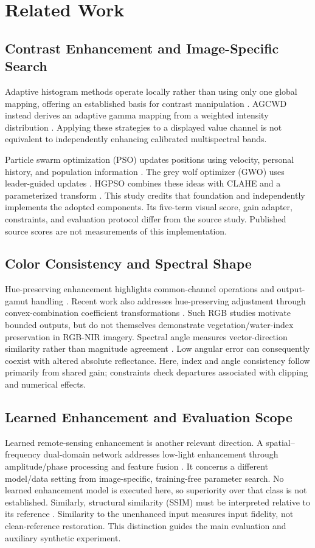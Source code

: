 \documentclass[conference]{IEEEtran}
\begin{document}
\section{Related Work}
\label{sec:related}
\subsection{Contrast Enhancement and Image-Specific Search}
Adaptive histogram methods operate locally rather than using only one global mapping, offering an established basis for contrast manipulation \cite{pizer1987}. AGCWD instead derives an adaptive gamma mapping from a weighted intensity distribution \cite{huang2013}. Applying these strategies to a displayed value channel is not equivalent to independently enhancing calibrated multispectral bands.

Particle swarm optimization (PSO) updates positions using velocity, personal history, and population information \cite{poli2007}. The grey wolf optimizer (GWO) uses leader-guided updates \cite{mirjalili2014}. HGPSO combines these ideas with CLAHE and a parameterized transform \cite{rentapalli2026}. This study credits that foundation and independently implements the adopted components. Its five-term visual score, gain adapter, constraints, and evaluation protocol differ from the source study. Published source scores are not measurements of this implementation.

\subsection{Color Consistency and Spectral Shape}
Hue-preserving enhancement highlights common-channel operations and output-gamut handling \cite{naik2003}. Recent work also addresses hue-preserving adjustment through convex-combination coefficient transformations \cite{ueda2025}. Such RGB studies motivate bounded outputs, but do not themselves demonstrate vegetation/water-index preservation in RGB-NIR imagery. Spectral angle measures vector-direction similarity rather than magnitude agreement \cite{kruse1993}. Low angular error can consequently coexist with altered absolute reflectance. Here, index and angle consistency follow primarily from shared gain; constraints check departures associated with clipping and numerical effects.

\subsection{Learned Enhancement and Evaluation Scope}
Learned remote-sensing enhancement is another relevant direction. A spatial--frequency dual-domain network addresses low-light enhancement through amplitude/phase processing and feature fusion \cite{yao2024}. It concerns a different model/data setting from image-specific, training-free parameter search. No learned enhancement model is executed here, so superiority over that class is not established. Similarly, structural similarity (SSIM) must be interpreted relative to its reference \cite{wang2004}. Similarity to the unenhanced input measures input fidelity, not clean-reference restoration. This distinction guides the main evaluation and auxiliary synthetic experiment.
\end{document}
